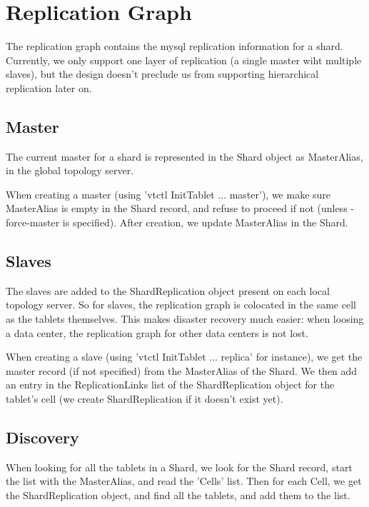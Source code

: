 \section{Replication Graph}\hypertarget{replication-graph}{}\label{replication-graph}

The replication graph contains the mysql replication information for a shard. Currently, we only support one layer
of replication (a single master wiht multiple slaves), but the design doesn't preclude us from supporting
hierarchical replication later on.

\subsection{Master}\hypertarget{master}{}\label{master}

The current master for a shard is represented in the Shard object as MasterAlias, in the global topology server.

When creating a master (using 'vtctl InitTablet ... master'), we make sure MasterAlias is empty in the Shard record, and refuse to proceed if not (unless -force-master is specified). After creation, we update MasterAlias in the Shard.

\subsection{Slaves}\hypertarget{slaves}{}\label{slaves}

The slaves are added to the ShardReplication object present on each local topology server. So for slaves, the
replication graph is colocated in the same cell as the tablets themselves. This makes disaster recovery much easier:
when loosing a data center, the replication graph for other data centers is not lost.

When creating a slave (using 'vtctl InitTablet ... replica' for instance), we get the master record (if not specified) from the MasterAlias of the Shard. We then add an entry in the ReplicationLinks list of the ShardReplication object for the tablet’s cell (we create ShardReplication if it doesn’t exist yet).

\subsection{Discovery}\hypertarget{discovery}{}\label{discovery}

When looking for all the tablets in a Shard, we look for the Shard record, start the list with the MasterAlias, and read the 'Cells' list. Then for each Cell, we get the ShardReplication object, and find all the tablets, and add them to the list.

